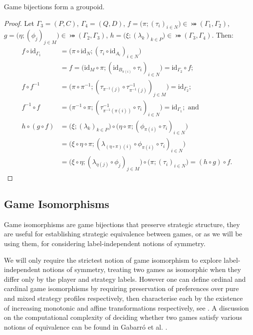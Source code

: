     \begin{theorem} \label{bijgroupoidthm}
        Game bijections form a groupoid.
            
        \begin{proof}
            Let $\Gamma_3 = (P, C)$, $\Gamma_4 = (Q, D)$, $f = \bigl(\pi; (\tau_i)_{i \in N}\bigr) \in \bij(\Gamma_1, \Gamma_2)$, $g = \bigl(\eta; (\phi_j)_{j \in M}\bigr) \in \bij(\Gamma_2, \Gamma_3)$, $h = \bigl(\xi ; (\lambda_k)_{k \in P}\bigr) \in \bij(\Gamma_3, \Gamma_4)$. Then:
            \begin{align*}
                f \circ \text{id}_{\Gamma_1} &= \bigl(\pi \circ \text{id}_N; (\tau_i \circ \text{id}_{A_i})_{i \in N}\bigr) \\ 
                      &= f = \bigl(\text{id}_M \circ \pi; (\text{id}_{B_{\pi(i)}} \circ \tau_i)_{i \in N}\bigr) = \text{id}_{\Gamma_2} \circ f; \\
                f \circ f^{-1} &= \bigl(\pi \circ \pi^{-1}; (\tau_{\pi^{-1}(j)} \circ \tau^{-1}_{\pi^{-1}(j)})_{j \in M}\bigr) = \text{id}_{\Gamma_2}; \\
                f^{-1} \circ f &= \bigl(\pi^{-1} \circ \pi; (\tau^{-1}_{\pi^{-1}(\pi(i))} \circ \tau_i)_{i \in N}\bigr) = \text{id}_{\Gamma_1}; \text{ and} \\
                h \circ (g \circ f) &= \bigl(\xi ; (\lambda_k)_{k \in P}\bigr) \circ \bigl(\eta \circ \pi; (\phi_{\pi(i)} \circ \tau_i)_{i \in N}\bigr) \\
                    &= \bigl(\xi \circ \eta \circ \pi; (\lambda_{(\eta \circ \pi)(i)} \circ \phi_{\pi(i)} \circ \tau_i)_{i \in N}\bigr) \\
                    &= \bigl(\xi \circ \eta; (\lambda_{\eta(j)} \circ \phi_j)_{j \in M}\bigr) \circ \bigl(\pi; (\tau_i)_{i \in N}\bigr) = (h \circ g) \circ f.
			\end{align*}
		\end{proof}
	\end{theorem}
     
        
    \subsection {Game Isomorphisms}
	Game isomorphisms are game bijections that preserve strategic structure, they are useful for establishing strategic equivalence between games, or as we will be using them, for considering label-independent notions of symmetry.
        
	We will only require the strictest notion of game isomorphism to explore label-independent notions of symmetry, treating two games as isomorphic when they differ only by the player and strategy labels. However one can define ordinal and cardinal game isomorphisms by requiring preservation of preferences over pure and mixed strategy profiles respectively, then characterise each by the existence of increasing monotonic and affine transformations respectively, see \cite[Propositions 4.3.2 and 4.3.5]{ham2011honoursthesis}. A discussion on the computational complexity of deciding whether two games satisfy various notions of equivalence can be found in Gabarr\'{o} et al. \cite{IsoComplexity}.
        
